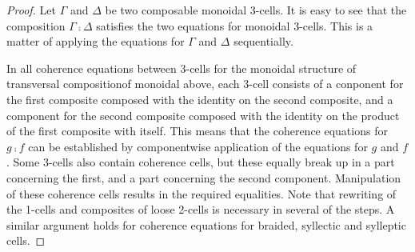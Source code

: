 \begin{proof}
Let $\Gamma$ and $\Delta$ be two composable monoidal 3-cells. It is easy to see that the composition $\Gamma \comp \Delta$ satisfies the two equations for monoidal 3-cells. This is a matter of applying the equations for $\Gamma$ and $\Delta$ sequentially.

In all coherence equations between 3-cells for the monoidal structure of transversal compositionof monoidal above, each 3-cell consists of a conponent for the first composite  composed with the identity on the second composite, and a component for the second composite composed with the identity on the product of the first composite with itself. This means that the coherence equations for $g \comp f$  can be established by componentwise application of the equations for $g$ and $f$. Some 3-cells also contain coherence cells, but these equally break up in a part concerning the first, and a part concerning the second component. Manipulation of these coherence cells results in the required equalities. Note that rewriting of the 1-cells and composites of loose 2-cells is necessary in several of the steps. A similar argument holds for coherence equations for braided, syllectic and sylleptic cells.

\end{proof}

